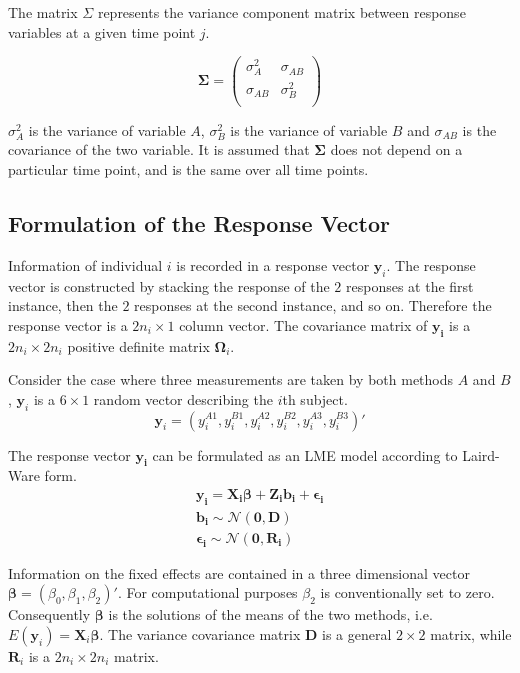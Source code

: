 \documentclass[12pt, a4paper]{report}
\theoremstyle{plain}
\theoremstyle{definition}
\theoremstyle{remark}
\begin{document}
		The matrix $\Sigma$ represents the variance component matrix between response variables at a given time point $j$.
		
		\[
		\boldsymbol{\Sigma} = \left( \begin{array}{cc}
		\sigma^2_{A} & \sigma_{AB} \\
		\sigma_{AB} & \sigma^2_{B}\\
		\end{array}   \right)
		\]
		
		$\sigma^2_{A}$ is the variance of variable $A$, $\sigma^2_{B}$ is the variance of variable $B$ and $\sigma_{AB}$ is the covariance of the two variable. It is assumed that $\boldsymbol{\Sigma}$ does not depend on a particular time point, and is the same over all time points.
		

		\subsection{Formulation of the Response Vector}
		Information of individual $i$ is recorded in a response vector $\boldsymbol{y}_{i}$. The response vector is constructed by stacking the response of the $2$ responses at the first instance, then the $2$ responses at the second instance, and so on. Therefore the response vector is a $2n_{i} \times 1$ column vector.
		The covariance matrix of $\boldsymbol{y_{i}}$ is a $2n_{i} \times 2n_{i}$ positive definite matrix $\boldsymbol{\Omega}_{i}$.
		
		Consider the case where three measurements are taken by both methods $A$ and $B$, $\boldsymbol{y}_{i}$ is a $6 \times 1$ random vector describing the $i$th subject.
		\[
		\boldsymbol{y}_{i} = (y_{i}^{A1},y_{i}^{B1},y_{i}^{A2},y_{i}^{B2},y_{i}^{A3},y_{i}^{B3}) \prime
		\]
		
		The response vector $\boldsymbol{y_{i}}$ can be formulated as an LME model according to Laird-Ware form.
		\begin{eqnarray*}
			\boldsymbol{y_{i}} = \boldsymbol{X_{i}\beta}  + \boldsymbol{Z_{i}b_{i}} + \boldsymbol{\epsilon_{i}}\\
			\boldsymbol{b_{i}} \sim \mathcal{N}(\boldsymbol{0,D})\\
			\boldsymbol{\epsilon_{i}} \sim \mathcal{N}(\boldsymbol{0,R_{i}})
		\end{eqnarray*}
		
		Information on the fixed effects are contained in a three dimensional vector $\boldsymbol{\beta} = (\beta_{0},\beta_{1},\beta_{2})\prime$. For computational purposes $\beta_{2}$ is conventionally set to zero. Consequently $\boldsymbol{\beta}$ is the solutions of the means of the two methods, i.e. $E(\boldsymbol{y}_{i})  = \boldsymbol{X}_{i}\boldsymbol{\beta}$. The variance covariance matrix $\boldsymbol{D}$ is a general $2 \times 2$ matrix, while $\boldsymbol{R}_{i}$ is a $2n_{i} \times 2n_{i}$ matrix.
		
\end{document}
